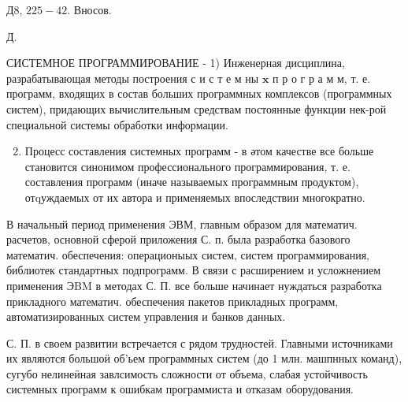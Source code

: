 \documentclass[10pt]{article}
\begin{document}
Д8, $225-42$. Вносов.

Д.



СИСТЕМНОЕ ПРОГРАММИРОВАНИЕ - 1) Инженерная дисциплина, разрабатывающая методы построения с и с т е м ны $\mathbf{x}$ п р о г р а м м, т. е. программ, входящих в состав больших программных комплексов (программных систем), придающих вычислительным средствам постоянные функции нек-рой специальной системы обработки информации.



\begin{enumerate}

  \setcounter{enumi}{1}

  \item Процесс составления системных программ - в әтом качестве все больше становится синонимом профессионального программирования, т. е. составления программ (иначе называемых программным продуктом), отqуждаемых от их автора и применяемых впоследствии многократно.

\end{enumerate}



В начальный период применения ЭВМ, главным образом для математич. расчетов, основной сферой приложения С. п. была разработка базового математич. обеспечения: операционыых систем, систем программирования, библиотек стандартных подпрограмм. В связи с расширением и усложнением применения ЭBM в методах С. П. все больше начинает нуждаться разработка прикладного математич. обеспечения пакетов прикладных программ, автоматизированных систем управления и банков данных.



С. П. в своем развитии встречается с рядом трудностей. Главными источниками их являются большоӥ об'ьем программных систем (до 1 млн. машпнных команд), сугубо нелинеӥная завлсимость сложности от объема, слабая устойчивость системных программ к ошибкам программиста и отказам оборудования.
\end{document}
